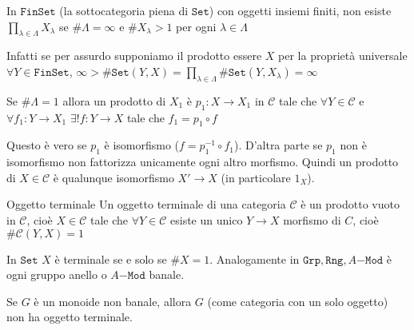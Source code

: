 \begin{example}{}
    In \(\mathtt{FinSet}\) (la sottocategoria piena di \(\mathtt{Set}\)) con
    oggetti insiemi finiti, non esiste \(\prod_{\lambda \in \Lambda} X_\lambda\) se \(\# \Lambda = \infty\) e \(\# X_\lambda > 1\) per ogni \(\lambda \in \Lambda\) 

    Infatti se per assurdo supponiamo il prodotto essere \(X\) per la proprietà
    universale \(\forall Y \in \mathtt{FinSet}\), \( \infty > 
    \# \mathtt{Set}{(Y, X)} = \prod_{\lambda \in \Lambda} \# \mathtt{Set}(Y,
    X_\lambda) = \infty\) 
\end{example}

\begin{remark}{}
    Se \(\# \Lambda = 1\) allora un prodotto di \(X_1\) è \(p_1 : X \to X_{1}\)
    in \(\mathcal{C}\) tale che \(\forall Y \in \mathcal{C}\) e \(\forall f_{1} : Y \to X_{1}\) 
    \(\exists ! f : Y \to X\) tale che \(f_{1} = p_{1} \circ f\) 

    Questo è vero se \(p_{1}\) è isomorfismo (\(f = p_{1}^{-1} \circ f_{1}\)).
    D'altra parte se \(p_{1}\) non è isomorfismo non fattorizza unicamente ogni
    altro morfismo. Quindi un prodotto di \(
    X \in \mathcal{C}\) è qualunque isomorfismo \(X' \to X\) (in particolare \(1_X\)).
\end{remark}

\begin{definition}{Oggetto terminale}
    Un oggetto terminale di una categoria \(\mathcal{C}\) è un prodotto vuoto in
    \(\mathcal{C}\), cioè \(X \in \mathcal{C}\) tale che \(\forall Y \in \mathcal{C}\) esiste un unico \(Y \to X\) morfismo di \(C\), cioè \(\#\mathcal{C}{(Y, X)} = 1\) 
\end{definition}

\begin{example}{}
    In \(\mathtt{Set}\) \(X\) è terminale se e solo se \(\# X = 1\).
    Analogamente in \(\mathtt{Grp}, \mathtt{Rng}, A\mathtt{-Mod}\) è ogni gruppo
    anello o \(A\mathtt{-Mod}\) banale.
\end{example}

\begin{example}{}
    Se \(G\) è un monoide non banale, allora \(G\) (come categoria con un solo
    oggetto) non ha oggetto terminale.
\end{example}

